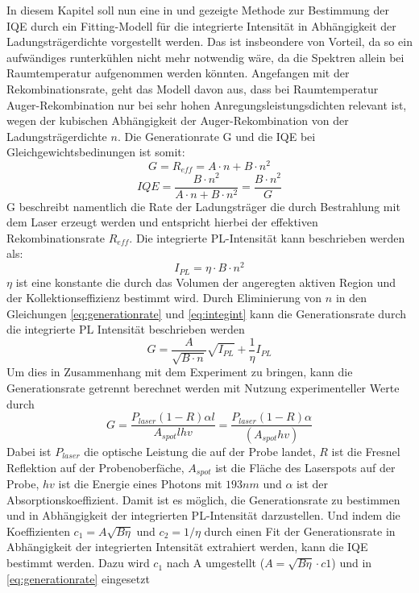 \noindent
In diesem Kapitel soll nun eine in \cite{doi:10.1063/1.3100773} und \cite{doi:10.1063/1.4917540} gezeigte Methode zur Bestimmung der IQE durch ein Fitting-Modell für die integrierte Intensität in Abhängigkeit der Ladungsträgerdichte vorgestellt werden. Das ist insbeondere von Vorteil, da so ein aufwändiges runterkühlen nicht mehr notwendig wäre, da die Spektren allein bei Raumtemperatur aufgenommen werden könnten. 
\newline
Angefangen mit der Rekombinationsrate, geht das Modell davon aus,
dass bei Raumtemperatur Auger-Rekombination nur bei sehr hohen Anregungsleistungsdichten relevant ist, wegen der kubischen Abhängigkeit der Auger-Rekombination von der Ladungsträgerdichte $n$. Die Generationrate G und die IQE bei Gleichgewichtsbedinungen ist somit:
\begin{equation}
    G = R_{eff} = A \cdot n + B \cdot n^2
    \label{eq:generationrate}
\end{equation}  
\begin{equation}
    IQE = \frac{B\cdot n^2}{A \cdot n + B \cdot n^2} = \frac{B\cdot n^2}{G}
    \label{eq:iqe2}
\end{equation}  
G beschreibt namentlich die Rate der Ladungsträger die durch Bestrahlung mit dem Laser erzeugt werden und entspricht hierbei der effektiven Rekombinationsrate $R_{eff}$.
Die integrierte PL-Intensität kann beschrieben werden als:
\begin{equation}
    I_{PL} = \eta \cdot B \cdot n^2
    \label{eq:integint}
\end{equation} 
$\eta$ ist eine konstante die durch das Volumen der angeregten aktiven Region und der Kollektionseffizienz bestimmt wird. Durch Eliminierung von $n$ in den Gleichungen \ref{eq:generationrate} und \ref{eq:integint} kann die Generationsrate durch die integrierte PL Intensität beschrieben werden
\begin{equation}
    G = \frac{A}{\sqrt{B\cdot n}}\sqrt{I_{PL}} + \frac{1}{\eta} I_{PL}
\end{equation} 
Um dies in Zusammenhang mit dem Experiment zu bringen, kann die Generationsrate getrennt berechnet werden mit Nutzung experimenteller Werte durch 
\begin{equation}
    G = \frac{P_{laser} (1-R)\alpha l}{A_{spot} l h v} = \frac{P_{laser}(1-R) \alpha }{ (A_{spot} h v)}
\end{equation} 
Dabei ist $P_{laser}$ die optische Leistung die auf der Probe landet, $R$ ist die Fresnel Reflektion auf der Probenoberfäche, $A_{spot}$ ist die Fläche des Laserspots auf der Probe, $h v$ ist die Energie eines Photons mit $193 nm$ und $\alpha$ ist der Absorptionskoeffizient. Damit ist es möglich, die Generationsrate zu bestimmen und in Abhängigkeit der integrierten PL-Intensität darzustellen. Und indem die Koeffizienten $c_1 = A \sqrt{B  \eta}$ und $c_2 = 1 / \eta$ durch einen Fit der Generationsrate in Abhängigkeit der integrierten Intensität extrahiert werden, kann die IQE bestimmt werden. Dazu wird $c_1$ nach A umgestellt ($A = \sqrt{B \eta} \cdot c1$) und in \ref{eq:generationrate} eingesetzt
